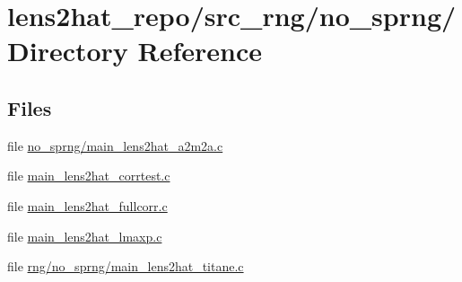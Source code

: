 \section{lens2hat\-\_\-repo/src\-\_\-rng/no\-\_\-sprng/ Directory Reference}
\label{dir_96f87f081db03cfad979ed32056ab637}
\subsection*{Files}
\begin{DoxyCompactItemize}
\item 
file \hyperlink{no__sprng_2main__lens2hat__a2m2a_8c}{no\-\_\-sprng/main\-\_\-lens2hat\-\_\-a2m2a.\-c}
\item 
file \hyperlink{main__lens2hat__corrtest_8c}{main\-\_\-lens2hat\-\_\-corrtest.\-c}
\item 
file \hyperlink{main__lens2hat__fullcorr_8c}{main\-\_\-lens2hat\-\_\-fullcorr.\-c}
\item 
file \hyperlink{main__lens2hat__lmaxp_8c}{main\-\_\-lens2hat\-\_\-lmaxp.\-c}
\item 
file \hyperlink{rng_2no__sprng_2main__lens2hat__titane_8c}{rng/no\-\_\-sprng/main\-\_\-lens2hat\-\_\-titane.\-c}
\end{DoxyCompactItemize}
